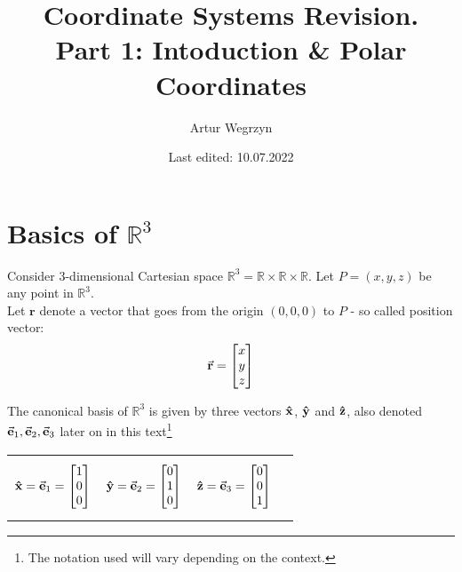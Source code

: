 \documentclass[12pt]{article}
\begin{document}
\title{Coordinate Systems Revision. \\ Part 1: Intoduction \& Polar Coordinates}
\author{Artur Wegrzyn}
\date{Last edited: 10.07.2022}
\maketitle


\tableofcontents



\section{Basics of $\mathbb{R}^3$}
Consider 3-dimensional Cartesian space $\mathbb{R}^3 = \mathbb{R} \times \mathbb{R} \times \mathbb{R}$. Let $P = (x, y, z)$ be any point in $\mathbb{R}^3$.
\\ \indent Let $\textbf{r}$ denote a vector that goes from the origin 
$(0, 0, 0)$ to $P$ - so called position vector:
\begin{equation}
\label{position_vector_1}
\va{r} = 
\begin{bmatrix}
x \\ y \\ z
\end{bmatrix}
\end{equation}

The canonical basis of $\mathbb{R}^3$ is given by three vectors $\vu{x}$, $\vu{y}$ and $\vu{z}$, also denoted $\va{e}_1, \va{e}_2, \va{e}_3$ later on in this text\footnote{The notation used will vary depending on the context. }

\begin{tabularx}{\linewidth}{@{}XX@{}XX@{}}
\begin{equation*}
\vu{x} = \va{e}_1 = 
\begin{bmatrix}
1 \\ 0 \\ 0
\end{bmatrix}
\end{equation*}
&
\begin{equation*}
\vu{y} = \va{e}_2 =  
\begin{bmatrix}
0 \\ 1 \\ 0
\end{bmatrix}
\end{equation*} 
&
\begin{equation*}
\vu{z} =  \va{e}_3 = 
\begin{bmatrix}
0 \\ 0 \\ 1
\end{bmatrix}
\end{equation*}
\end{tabularx}
\end{document}
